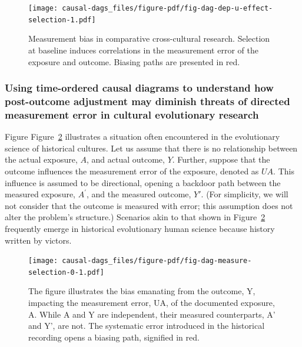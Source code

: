 \documentclass[
  singlecolumn]{article}
\begin{document}
\begin{figure}

{\centering \texttt{[image: causal-dags\_files/figure-pdf/fig-dag-dep-u-effect-selection-1.pdf]}

}

\caption{\label{fig-dag-dep-u-effect-selection}Measurement bias in
comparative cross-cultural research. Selection at baseline induces
correlations in the measurement error of the exposure and outcome.
Biasing paths are presented in red.}

\end{figure}

\hypertarget{using-time-ordered-causal-diagrams-to-understand-how-post-outcome-adjustment-may-diminish-threats-of-directed-measurement-error-in-cultural-evolutionary-research}{%
\subsubsection{Using time-ordered causal diagrams to understand how
post-outcome adjustment may diminish threats of directed measurement
error in cultural evolutionary
research}\label{using-time-ordered-causal-diagrams-to-understand-how-post-outcome-adjustment-may-diminish-threats-of-directed-measurement-error-in-cultural-evolutionary-research}}

Figure Figure~\ref{fig-dag-measure-selection-0} illustrates a situation
often encountered in the evolutionary science of historical cultures.
Let us assume that there is no relationship between the actual exposure,
\(A\), and actual outcome, \(Y\). Further, suppose that the outcome
influences the measurement error of the exposure, denoted as \(UA\).
This influence is assumed to be directional, opening a backdoor path
between the measured exposure, \(A^{\prime}\), and the measured outcome,
\(Y'\). (For simplicity, we will not consider that the outcome is
measured with error; this assumption does not alter the problem's
structure.) Scenarios akin to that shown in
Figure~\ref{fig-dag-measure-selection-0} frequently emerge in historical
evolutionary human science because history written by victors.

\begin{figure}

{\centering \texttt{[image: causal-dags\_files/figure-pdf/fig-dag-measure-selection-0-1.pdf]}

}

\caption{\label{fig-dag-measure-selection-0}The figure illustrates the
bias emanating from the outcome, Y, impacting the measurement error, UA,
of the documented exposure, A. While A and Y are independent, their
measured counterparts, A' and Y', are not. The systematic error
introduced in the historical recording opens a biasing path, signified
in red.}

\end{figure}
\end{document}
